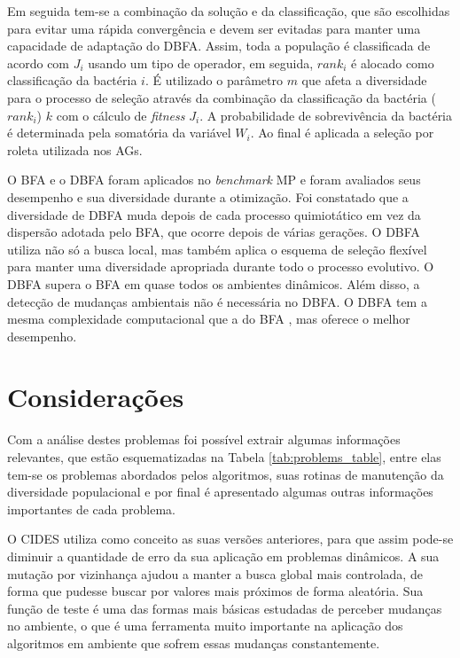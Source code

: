 Em seguida tem-se a combinação da solução e da classificação, que são escolhidas para evitar uma rápida convergência e devem ser evitadas para manter uma capacidade de adaptação do DBFA. Assim, toda a população é classificada de acordo com $J_i$ usando um tipo de operador, em seguida, $rank_i$ é alocado como classificação da bactéria $i$. É utilizado o parâmetro $m$ que afeta a diversidade para o processo de seleção através da combinação da classificação da bactéria ($rank_i$) $k$ com o cálculo de \textit{fitness} $J_i$. A probabilidade de sobrevivência da bactéria é determinada pela somatória da variável $W_i$. Ao final é aplicada a seleção por roleta utilizada nos AGs.

O BFA e o DBFA foram aplicados no \textit{benchmark} MP e foram avaliados seus desempenho e sua diversidade durante a otimização. Foi constatado que a diversidade de DBFA muda depois de cada processo quimiotático em vez da dispersão adotada pelo BFA, que ocorre depois de várias gerações. O DBFA utiliza não só a busca local, mas também aplica o esquema de seleção flexível para manter uma diversidade apropriada durante todo o processo evolutivo. O DBFA supera o BFA em quase todos os ambientes dinâmicos. Além disso, a detecção de mudanças ambientais não é necessária no DBFA. O DBFA tem a mesma complexidade computacional que a do BFA , mas oferece o melhor desempenho.

\section{Considerações}
\label{sec:problems_considerations}

Com a análise destes problemas foi possível extrair algumas informações relevantes, que estão esquematizadas na Tabela \ref{tab:problems_table}, entre elas tem-se os problemas abordados pelos algoritmos, suas rotinas de manutenção da diversidade populacional e por final é apresentado algumas outras informações importantes de cada problema.

O CIDES utiliza como conceito as suas versões anteriores, para que assim pode-se diminuir a quantidade de erro da sua aplicação em problemas dinâmicos. A sua mutação por vizinhança ajudou a manter a busca global mais controlada, de forma que pudesse buscar por valores mais próximos de forma aleatória. Sua função de teste é uma das formas mais básicas estudadas de perceber mudanças no ambiente, o que é uma ferramenta muito importante na aplicação dos algoritmos em ambiente que sofrem essas mudanças constantemente.


